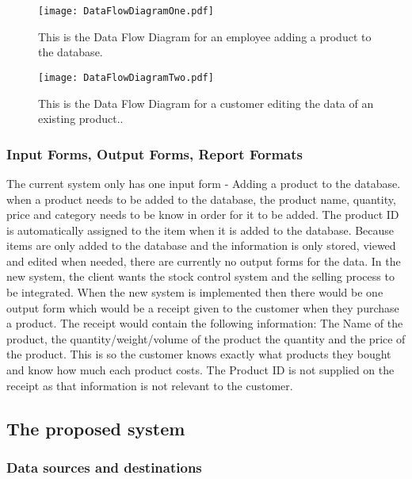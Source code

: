 \begin{figure}[H]
\texttt{[image: DataFlowDiagramOne.pdf]}
\caption{This is the Data Flow Diagram for an employee adding a product to the database.} \label{fig:DataFlowDiagram1}
\end{figure}


\begin{figure}[H]
\texttt{[image: DataFlowDiagramTwo.pdf]}
\caption{This is the Data Flow Diagram for a customer editing the data of an existing product..} \label{fig:DataFlowDiagram2}
\end{figure}

\subsubsection{Input Forms, Output Forms, Report Formats}

The current system only has one input form - Adding a product to the database. when a product needs to be added to the database, the product name, quantity, price and category needs to be know in order for it to be added. The product ID is automatically assigned to the item when it is added to the database. Because items are only added to the database and the information is only stored, viewed and edited when needed, there are currently no output forms for the data. In the new system, the client wants the stock control system and the selling process to be integrated. When the new system is implemented then there would be one output form which would be a receipt given to the customer when they purchase a product. The receipt would contain the following information: The Name of the product, the quantity/weight/volume of the product the quantity and the price of the product. This is so the customer knows exactly what products they bought and know how much each product costs. The Product ID is not supplied on the receipt as that information is not relevant to the customer.

\subsection{The proposed system}

\subsubsection{Data sources and destinations}

